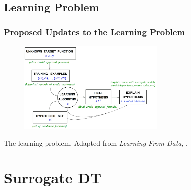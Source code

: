 \documentclass[11pt, 
               aspectratio=169
               ]{beamer}
\begin{document}
    \subsection{Learning Problem}
	
		\begin{frame}
		
			\frametitle{Proposed Updates to the Learning Problem}
			
			\begin{figure}[htb]
				\begin{center}
					\includegraphics[height=125pt]{img/learning_problem.png}
					\label{fig:learning_problem}
				\end{center}
			\end{figure}
			
			The learning problem. Adapted from \textit{Learning From Data}, \cite{lfd}.
			
		\end{frame}

	\section{Surrogate DT}
\end{document}
